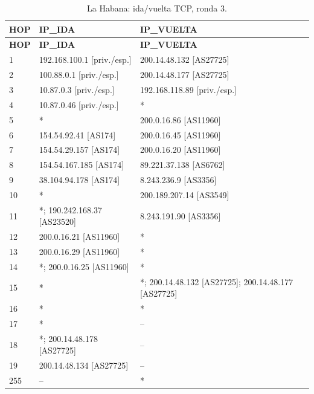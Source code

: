 \begin{longtable}{p{0.95cm}p{7.075cm}p{7.075cm}}
\caption{La Habana: ida/vuelta TCP, ronda 3.}\label{anexo:vuelta:200.14.48.134:TCP:3} \\
\toprule
\textbf{HOP} & \textbf{IP\_\allowbreak{}IDA} & \textbf{IP\_\allowbreak{}VUELTA} \\ \midrule
\endfirsthead
\toprule
\textbf{HOP} & \textbf{IP\_\allowbreak{}IDA} & \textbf{IP\_\allowbreak{}VUELTA} \\ \midrule
\endhead
1 & 192.168.100.1 [priv./esp.] & 200.14.48.132 [AS27725] \\
2 & 100.88.0.1 [priv./esp.] & 200.14.48.177 [AS27725] \\
3 & 10.87.0.3 [priv./esp.] & 192.168.118.89 [priv./esp.] \\
4 & 10.87.0.46 [priv./esp.] & * \\
5 & * & 200.0.16.86 [AS11960] \\
6 & 154.54.92.41 [AS174] & 200.0.16.45 [AS11960] \\
7 & 154.54.29.157 [AS174] & 200.0.16.20 [AS11960] \\
8 & 154.54.167.185 [AS174] & 89.221.37.138 [AS6762] \\
9 & 38.104.94.178 [AS174] & 8.243.236.9 [AS3356] \\
10 & * & 200.189.207.14 [AS3549] \\
11 & *; 190.242.168.37 [AS23520] & 8.243.191.90 [AS3356] \\
12 & 200.0.16.21 [AS11960] & * \\
13 & 200.0.16.29 [AS11960] & * \\
14 & *; 200.0.16.25 [AS11960] & * \\
15 & * & *; 200.14.48.132 [AS27725]; 200.14.48.177 [AS27725] \\
16 & * & * \\
17 & * & -- \\
18 & *; 200.14.48.178 [AS27725] & -- \\
19 & 200.14.48.134 [AS27725] & -- \\
255 & -- & * \\
\bottomrule
\end{longtable}
\endgroup
